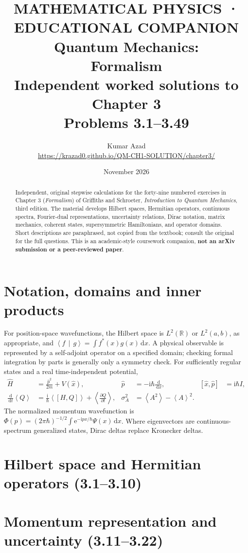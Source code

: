 \documentclass[11pt,a4paper]{article}
\title{\textcolor{accent}{\small MATHEMATICAL PHYSICS · EDUCATIONAL COMPANION}\\[8pt]
\textbf{\Huge Quantum Mechanics:\\Formalism}\\[11pt]
{\large Independent worked solutions to Chapter 3}\\[4pt]
{\normalsize Problems 3.1–3.49}}
\author{Kumar Azad\\ \small\url{https://krazad0.github.io/QM-CH1-SOLUTION/chapter3/}}
\date{November 2026}
\numberwithin{equation}{section}
\newcommand{\dd}{\,\mathrm{d}}
\newcommand{\ii}{\mathrm{i}}
\newcommand{\ee}{\mathrm{e}}
\newcommand{\braket}[2]{\left\langle#1\,\middle|\,#2\right\rangle}
\newcommand{\avg}[1]{\left\langle#1\right\rangle}
\newcommand{\comm}[2]{\left[#1,#2\right]}
\begin{document}
\maketitle
\begin{abstract}
Independent, original stepwise calculations for the forty-nine numbered exercises
in Chapter 3 (\emph{Formalism}) of Griffiths and Schroeter,
\emph{Introduction to Quantum Mechanics}, third edition.
The material develops Hilbert spaces, Hermitian operators, continuous
spectra, Fourier-dual representations, uncertainty relations, Dirac
notation, matrix mechanics, coherent states, supersymmetric
Hamiltonians, and operator domains. Short descriptions are
paraphrased, not copied from the textbook; consult the original for
the full questions. This is an academic-style coursework
companion, \textbf{not an arXiv submission or a peer-reviewed paper}.
\end{abstract}
\tableofcontents
\section{Notation, domains and inner products}
For position-space wavefunctions, the Hilbert space is
$L^2(\mathbb R)$ or $L^2(a,b)$, as appropriate, and
$\braket{f}{g}=\int f^*(x)g(x)\dd x$.
A physical observable is represented by a self-adjoint operator
on a specified domain; checking formal integration by parts
is generally only a symmetry check. For sufficiently regular
states and a real time-independent potential,
\begin{align}
\hat H&=\frac{\hat p^2}{2m}+V(\hat x),&
\hat p&=-\ii\hbar\frac{\dd}{\dd x},&
\comm{\hat x}{\hat p}&=\ii\hbar I,\\
\frac{\dd}{\dd t}\avg Q&=
\frac{\ii}{\hbar}\avg{\comm{H}{Q}}+
\left\langle\frac{\partial Q}{\partial t}\right\rangle,&
\sigma_A^2&=\avg{A^2}-\avg A^2.
\end{align}
The normalized momentum wavefunction is
$\Phi(p)=(2\pi\hbar)^{-1/2}\int\ee^{-\ii px/\hbar}\Psi(x)\dd x$.
Where eigenvectors are continuous-spectrum generalized states,
Dirac deltas replace Kronecker deltas.
\section{Hilbert space and Hermitian operators (3.1–3.10)}

\section{Momentum representation and uncertainty (3.11–3.22)}

\end{document}
